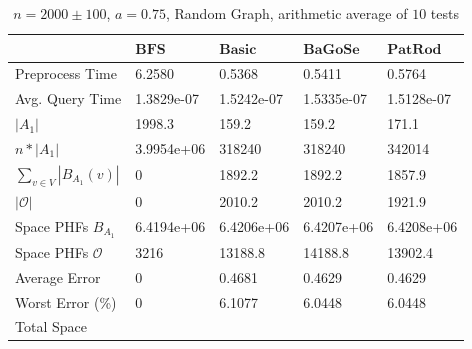 \documentclass[shortabstract, lic, english]{iithesis}
\theoremstyle{definition} \newtheorem{definition}{Definition}[chapter]
\theoremstyle{remark} \newtheorem{remark}[definition]{Observation}
\theoremstyle{plain} \newtheorem{theorem}[definition]{Theorem}
\theoremstyle{plain} \newtheorem{lemma}[definition]{Lemma}
\theoremstyle{plain} \newtheorem{conjecture}[definition]{Conjecture}
\begin{document}
\begin{table}[H] \label{test:random.a0.75}
    \centering
    \begin{tabular}{ |p{3cm}||p{2cm}|p{2cm}|p{2cm}|p{2cm}|  } 
        \hline
        & $\mathbf{BFS}$ & $\mathbf{Basic}$ & $\mathbf{BaGoSe}$ & $\mathbf{PatRod}$ \\
        \hline
        \hline
        Preprocess Time                 & 6.2580     & 0.5368     & 0.5411      & 0.5764     \\
        \hline
        Avg. Query Time                 & 1.3829e-07 & 1.5242e-07 & 1.5335e-07  & 1.5128e-07 \\
        \hline
        $|A_1|$                         & 1998.3     & 159.2      &  159.2      & 171.1      \\
        \hline
        $n * |A_1|$                     & 3.9954e+06 & 318240     &  318240     & 342014     \\
        \hline
        $\sum_{v \in V} |B_{A_1}(v)| $  & 0          & 1892.2     & 1892.2      & 1857.9     \\
        \hline
        $|\mathcal{O}|$                 & 0          & 2010.2     & 2010.2      & 1921.9     \\
        \hline
        Space PHFs $B_{A_1}$            & 6.4194e+06 & 6.4206e+06 & 6.4207e+06  & 6.4208e+06 \\
        \hline
        Space PHFs $\mathcal{O}$        & 3216       & 13188.8    & 14188.8     & 13902.4    \\
        \hline
        Average Error                   & 0          & 0.4681     & 0.4629      & 0.4629     \\
        \hline
        Worst Error (\%)                & 0          & 6.1077     & 6.0448      & 6.0448     \\
        \hline
        Total Space                     &            &            &             &            \\
        \hline

    \end{tabular}
    \caption{$n = 2000 \pm 100$, $a = 0.75$, Random Graph, arithmetic average of $10$ tests}
\end{table}
\end{document}
